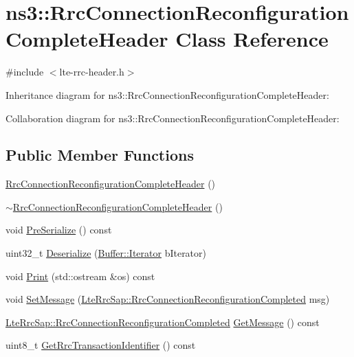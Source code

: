 \hypertarget{classns3_1_1RrcConnectionReconfigurationCompleteHeader}{}\section{ns3\+:\+:Rrc\+Connection\+Reconfiguration\+Complete\+Header Class Reference}
\label{classns3_1_1RrcConnectionReconfigurationCompleteHeader}


{\ttfamily \#include $<$lte-\/rrc-\/header.\+h$>$}



Inheritance diagram for ns3\+:\+:Rrc\+Connection\+Reconfiguration\+Complete\+Header\+:


Collaboration diagram for ns3\+:\+:Rrc\+Connection\+Reconfiguration\+Complete\+Header\+:
\subsection*{Public Member Functions}
\begin{DoxyCompactItemize}
\item 
\hyperlink{classns3_1_1RrcConnectionReconfigurationCompleteHeader_a54b68b44cebf4ae2e4873d929876c891}{Rrc\+Connection\+Reconfiguration\+Complete\+Header} ()
\item 
\hyperlink{classns3_1_1RrcConnectionReconfigurationCompleteHeader_ad100372e5c1320a98ccd80ff5a5d917a}{$\sim$\+Rrc\+Connection\+Reconfiguration\+Complete\+Header} ()
\item 
void \hyperlink{classns3_1_1RrcConnectionReconfigurationCompleteHeader_a024cff170e3811ab200d59ead7bf2113}{Pre\+Serialize} () const 
\item 
uint32\+\_\+t \hyperlink{classns3_1_1RrcConnectionReconfigurationCompleteHeader_a35f73b45bd52514418568eb28bdb13a6}{Deserialize} (\hyperlink{classns3_1_1Buffer_1_1Iterator}{Buffer\+::\+Iterator} b\+Iterator)
\item 
void \hyperlink{classns3_1_1RrcConnectionReconfigurationCompleteHeader_a8e35dcd9f894fb62e7f7a09c9a1ee66f}{Print} (std\+::ostream \&os) const 
\item 
void \hyperlink{classns3_1_1RrcConnectionReconfigurationCompleteHeader_addcb9537ee64f4f528ce817069836ba8}{Set\+Message} (\hyperlink{structns3_1_1LteRrcSap_1_1RrcConnectionReconfigurationCompleted}{Lte\+Rrc\+Sap\+::\+Rrc\+Connection\+Reconfiguration\+Completed} msg)
\item 
\hyperlink{structns3_1_1LteRrcSap_1_1RrcConnectionReconfigurationCompleted}{Lte\+Rrc\+Sap\+::\+Rrc\+Connection\+Reconfiguration\+Completed} \hyperlink{classns3_1_1RrcConnectionReconfigurationCompleteHeader_a425aff8f6b435ea8202114d075eb1717}{Get\+Message} () const 
\item 
uint8\+\_\+t \hyperlink{classns3_1_1RrcConnectionReconfigurationCompleteHeader_a033336b554f835fb5c00438f56262a96}{Get\+Rrc\+Transaction\+Identifier} () const 
\end{DoxyCompactItemize}
